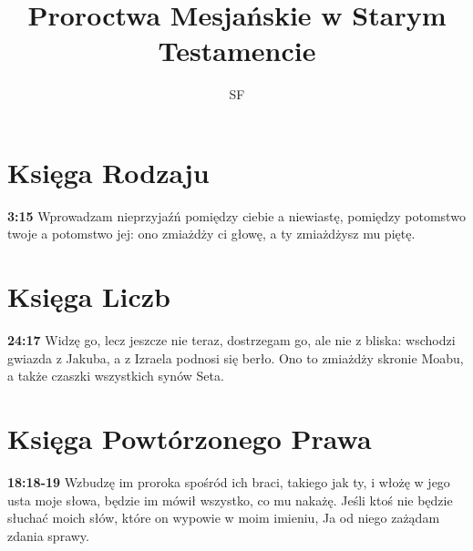 \documentclass[a4paper,11pt]{article}
\title{Proroctwa Mesjańskie w Starym Testamencie}
\author{SF}
\newcommand{\paddr}[1]{\textbf{#1}}
\begin{document}
\begin{fussy}

\maketitle
\tableofcontents

\section{Księga Rodzaju}

\paddr{3:15} Wprowadzam nieprzyjaźń pomiędzy ciebie a niewiastę, pomiędzy potomstwo twoje a potomstwo jej: ono zmiażdży ci głowę, a ty zmiażdżysz mu piętę.

\section{Księga Liczb}

\paddr{24:17} Widzę go, lecz jeszcze nie teraz, dostrzegam go, ale nie z bliska: wschodzi gwiazda z Jakuba, a z Izraela podnosi się berło. Ono to zmiażdży skronie Moabu, a także czaszki wszystkich synów Seta.

\section{Księga Powtórzonego Prawa}

\paddr{18:18-19} Wzbudzę im proroka spośród ich braci, takiego jak ty, i włożę w jego usta moje słowa, będzie im mówił wszystko, co mu nakażę. Jeśli ktoś nie będzie słuchać moich słów, które on wypowie w moim imieniu, Ja od niego zażądam zdania sprawy.

\end{fussy}
\end{document}
